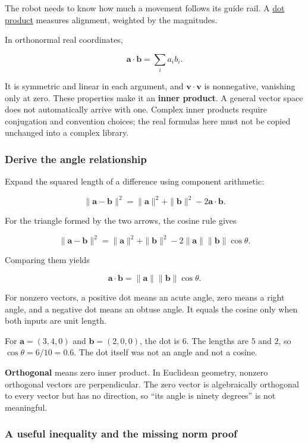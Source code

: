 The robot needs to know how much a movement follows its guide rail. A \hyperref[01-foundations-i-ch017]{dot product} measures alignment, weighted by the magnitudes.

In orthonormal real coordinates,

\[
\mathbf a\cdot\mathbf b=\sum_i a_i b_i.
\]

It is symmetric and linear in each argument, and \(\mathbf v\cdot\mathbf v\) is nonnegative, vanishing only at zero. These properties make it an \textbf{inner product}. A general vector space does not automatically arrive with one. Complex inner products require conjugation and convention choices; the real formulas here must not be copied unchanged into a complex library.

\subsubsection{Derive the angle relationship}\label{derive-the-angle-relationship}

Expand the squared length of a difference using component arithmetic:

\[
\|\mathbf a-\mathbf b\|^2
=\|\mathbf a\|^2+\|\mathbf b\|^2-2\mathbf a\cdot\mathbf b.
\]

For the triangle formed by the two arrows, the cosine rule gives

\[
\|\mathbf a-\mathbf b\|^2
=\|\mathbf a\|^2+\|\mathbf b\|^2
-2\|\mathbf a\|\|\mathbf b\|\cos\theta.
\]

Comparing them yields

\[
\mathbf a\cdot\mathbf b=\|\mathbf a\|\|\mathbf b\|\cos\theta.
\]

For nonzero vectors, a positive dot means an acute angle, zero means a right angle, and a negative dot means an obtuse angle. It equals the cosine only when both inputs are unit length.

For \(\mathbf a=(3,4,0)\) and \(\mathbf b=(2,0,0)\), the dot is \(6\). The lengths are \(5\) and \(2\), so \(\cos\theta=6/10=0.6\). The dot itself was not an angle and not a cosine.

\textbf{Orthogonal} means zero inner product. In Euclidean geometry, nonzero orthogonal vectors are perpendicular. The zero vector is algebraically orthogonal to every vector but has no direction, so ``its angle is ninety degrees'' is not meaningful.

\subsubsection{A useful inequality and the missing norm proof}\label{a-useful-inequality-and-the-missing-norm-proof}

